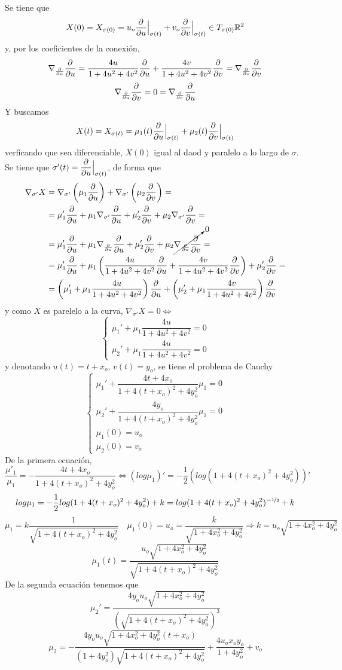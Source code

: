 \begin{sol}
    Se tiene que 
    $$X(0)=X_{\sigma(0)} = u_o \dfrac{\partial^{} }{\partial u}\Big|_{\sigma(t)}+v_o \dfrac{\partial^{} }{\partial v}\Big|_{\sigma(t)} \in T_{\sigma(0)}\mathbb{R}^2$$
    y, por los coeficientes de la conexi\'on,
    $$\nabla_{\frac{\partial}{\partial u}} \dfrac{\partial^{} }{\partial u} = \dfrac{4u}{1+4u^2+4v^2} \dfrac{\partial^{} }{\partial u} + \dfrac{4v}{1+4u^2+4v^2} \dfrac{\partial^{} }{\partial v} = \nabla_{\frac{\partial}{\partial v}} \dfrac{\partial^{} }{\partial v}$$
    $$\nabla_{\frac{\partial}{\partial u}} \dfrac{\partial^{} }{\partial v} = 0 = \nabla_{\frac{\partial}{\partial v}} \dfrac{\partial^{} }{\partial u}$$
    Y buscamos 
    $$X(t)=X_{\sigma(t)} = \mu_1(t) \dfrac{\partial^{} }{\partial u}\Big|_{\sigma(t)} + \mu_2(t) \dfrac{\partial^{} }{\partial v}\Big|_{\sigma(t)}$$
    verficando que sea diferenciable, $X(0)$ igual al daod y paralelo a lo largo de $\sigma$. Se tiene que $\sigma'(t)=\dfrac{\partial^{} }{\partial u}\Big|_{\sigma(t)}$, de forma que
    \[\begin{split}
        \nabla_{\sigma'}X & = \nabla_{\sigma'} \left( \mu_1 \dfrac{\partial^{} }{\partial u} \right)+  \nabla_{\sigma'} \left( \mu_2 \dfrac{\partial^{} }{\partial v} \right) = \\ & = \mu_1' \dfrac{\partial^{} }{\partial u} + \mu_1  \nabla_{\sigma'} \dfrac{\partial^{} }{\partial u} + \mu_2' \dfrac{\partial^{} }{\partial v} + \mu_2 \nabla_{\sigma'} \dfrac{\partial^{} }{\partial v} = \\ & = \mu_1' \dfrac{\partial^{} }{\partial u} + \mu_1  \nabla_{\frac{\partial}{\partial u}} \dfrac{\partial^{} }{\partial u} + \mu_2' \dfrac{\partial^{} }{\partial v} + \mu_2 \cancelto{0}{\nabla_{\frac{\partial}{\partial u}} \dfrac{\partial^{} }{\partial v}}=\\&= \mu_1' \dfrac{\partial^{} }{\partial u} + \mu_1 \left( \dfrac{4u}{1+4u^2+4v^2} \dfrac{\partial^{} }{\partial u} + \dfrac{4v}{1+4u^2+4v^2} \dfrac{\partial^{} }{\partial v}  \right) + \mu_2' \dfrac{\partial^{} }{\partial v} = \\ & = \left( \mu_1' + \mu_1 \dfrac{4u}{1+4u^2+4v^2}  \right) \dfrac{\partial^{} }{\partial u} + \left( \mu_2' + \mu_1 \dfrac{4v}{1+4u^2+4v^2}  \right) \dfrac{\partial^{} }{\partial v}
    \end{split}\]
    y como $X$ es parelelo a la curva, $\nabla_{\sigma'}X=0\iff$
    $$\begin{cases}
        \mu_1' + \mu_1 \dfrac{4u}{1+4u^2+4v^2}=0 \\ \mu_2' + \mu_1 \dfrac{4u}{1+4u^2+4v^2}=0
    \end{cases}$$
    y denotando $u(t)=t+x_o, \, v(t)=y_o$, se tiene el problema de Cauchy
    $$\begin{cases}
         \mu_1' + \dfrac{4t + 4x_o}{1+4(t+x_o)^2+4y_o^2} \mu_1 = 0\\ \mu_2' + \dfrac{4y_o}{1+4(t+x_o)^2+4y_o^2} \mu_1=0 \\ \mu_1(0)=u_o \\ \mu_2(0)=v_o
    \end{cases}$$
    De la primera ecuaci\'on,
    $$\dfrac{\mu'_1}{\mu_1} = -\dfrac{4t+4x_o}{1+4(t+x_o)^2 + 4y_o^2} \iff (log \mu_1)'= - \dfrac{1}{2} \left( log(1+4(t+x_o)^2 + 4y_o^2) \right)' $$
    $$log \mu_1 = -\dfrac{1}{2} log(1+4(t+x_o)^2 +4y_o^2) + k = log(1+4(t+x_o)^2 +4y_o^2)^{-\nicefrac{1}{2}} + k  $$
    $$\mu_1 = k \dfrac{1}{\sqrt{1+4(t+x_o)^2 +4y_o^2}}\quad \mu_1(0)=u_o=\dfrac{k}{\sqrt{1+4x_o^2 +4y_o^2}} \Rightarrow k =u_o\sqrt{1+4x_o^2 +4y_o^2}$$
    $$\mu_1(t)=\dfrac{u_o\sqrt{1+4x_o^2 +4y_o^2}}{\sqrt{1+4(t+x_o)^2 +4y_o^2}}$$
    De la segunda ecuaci\'on tenemos que
    $$\mu_2' = \dfrac{4 y_o u_o \sqrt{1+4x_o^2 +4y_o^2}}{\left(\sqrt{1+4(t+x_o)^2 +4y_o^2}\right)^3}$$
    $$\mu_2 = -\dfrac{4 y_o u_o \sqrt{1+4x_o^2 +4y_o^2}(t+x_o)}{(1+4y_o^2)\sqrt{1+4(t+x_o)^2 +4y_o^2}} + \dfrac{4u_ox_oy_o}{1+4y_o^2} + v_o$$
\end{sol}